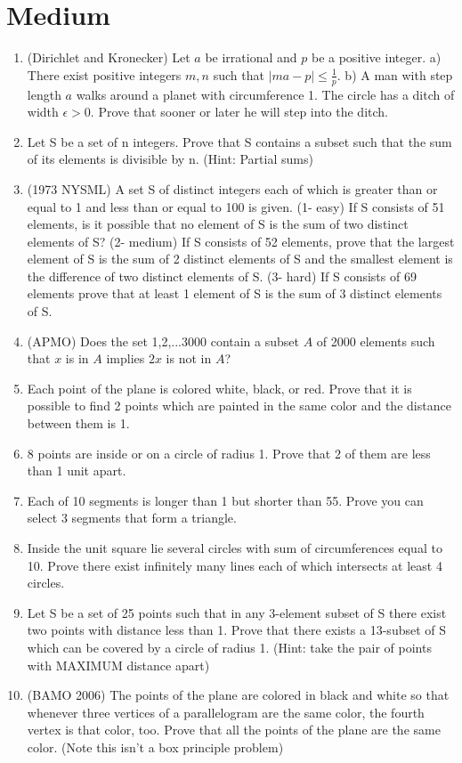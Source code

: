 \documentclass{article}
\begin{document}
\section{Medium}
\begin{enumerate}
\item (Dirichlet and Kronecker) Let $a$ be irrational and $p$ be a positive integer. a) There exist positive integers $m, n$ such that $\left|ma-p\right|\leq \frac{1}{p}$. b) A man with step length $a$ walks around a planet with circumference 1. The circle has a ditch of width $\epsilon>0$. Prove that sooner or later he will step into the ditch.
\item Let S be a set of n integers. Prove that S contains a subset such that the sum of its elements is divisible by n. (Hint: Partial sums)
\item (1973 NYSML) A set S of distinct integers each of which is greater than or equal to 1 and less than or equal to 100 is given. (1- easy) If S consists of 51 elements, is it possible that no element of S is the sum of two distinct elements of S? (2- medium) If S consists of 52 elements, prove that the largest element of S is the sum of 2 distinct elements of S and the smallest element is the difference of two distinct elements of S. (3- hard) If S consists of 69 elements prove that at least 1 element of S is the sum of 3 distinct elements of S.
\item (APMO) Does the set {1,2,...3000} contain a subset $A$ of 2000 elements such that $x$ is in $A$ implies $2x$ is not in $A$?
\item Each point of the plane is colored white, black, or red. Prove that it is possible to find 2 points which are painted in the same color and the distance between them is 1.
\item 8 points are inside or on a circle of radius 1. Prove that 2 of them are less than 1 unit apart.
\item Each of 10 segments is longer than 1 but shorter than 55. Prove you can select 3 segments that form a triangle.
\item Inside the unit square lie several circles with sum of circumferences equal to 10. Prove there exist infinitely many lines each of which intersects at least 4 circles.
\item Let S be a set of 25 points such that in any 3-element subset of S there exist two points with distance less than 1. Prove that there exists a 13-subset of S which can be covered by a circle of radius 1. (Hint: take the pair of points with MAXIMUM distance apart)
\item (BAMO 2006) The points of the plane are colored in black and white so that whenever three vertices of a
parallelogram are the same color, the fourth vertex is that color, too. Prove that all the points
of the plane are the same color. (Note this isn't a box principle problem)
\end{enumerate}
\end{document}
